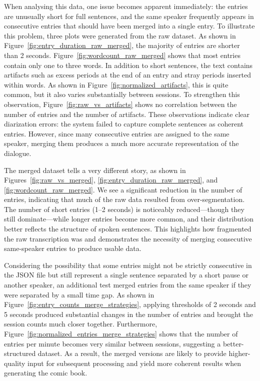When analysing this data, one issue becomes apparent immediately: the entries are unusually short for full sentences, and the same speaker frequently appears in consecutive entries that should have been merged into a single entry. To illustrate this problem, three plots were generated from the raw dataset. As shown in Figure~\ref{fig:entry_duration_raw_merged}, the majority of entries are shorter than 2 seconds. Figure~\ref{fig:wordcount_raw_merged} shows that most entries contain only one to three words. In addition to short sentences, the text contains artifacts such as excess periods at the end of an entry and stray periods inserted within words. As shown in Figure~\ref{fig:normalized_artifacts}, this is quite common, but it also varies substantially between sessions. To strengthen this observation, Figure~\ref{fig:raw_vs_artifacts} shows no correlation between the number of entries and the number of artifacts. These observations indicate clear diarization errors: the system failed to capture complete sentences as coherent entries. However, since many consecutive entries are assigned to the same speaker, merging them produces a much more accurate representation of the dialogue.

The merged dataset tells a very different story, as shown in Figures~\ref{fig:raw_vs_merged}, \ref{fig:entry_duration_raw_merged}, and \ref{fig:wordcount_raw_merged}. We see a significant reduction in the number of entries, indicating that much of the raw data resulted from over-segmentation. The number of short entries (1–2 seconds) is noticeably reduced—though they still dominate—while longer entries become more common, and their distribution better reflects the structure of spoken sentences. This highlights how fragmented the raw transcription was and demonstrates the necessity of merging consecutive same-speaker entries to produce usable data.

Considering the possibility that some entries might not be strictly consecutive in the JSON file but still represent a single sentence separated by a short pause or another speaker, an additional test merged entries from the same speaker if they were separated by a small time gap. As shown in Figure~\ref{fig:entry_counts_merge_strategies}, applying thresholds of 2 seconds and 5 seconds produced substantial changes in the number of entries and brought the session counts much closer together. Furthermore, Figure~\ref{fig:normalized_entries_merge_strategies} shows that the number of entries per minute becomes very similar between sessions, suggesting a better-structured dataset. As a result, the merged versions are likely to provide higher-quality input for subsequent processing and yield more coherent results when generating the comic book.

